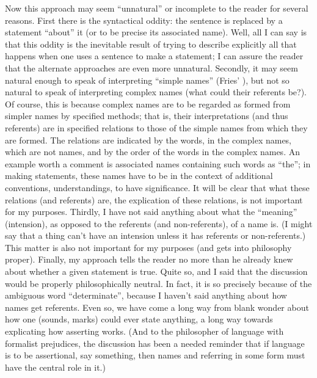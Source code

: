 Now this approach may seem \enquote{unnatural} or incomplete to the reader 
for several reasons. First there is the syntactical oddity: the sentence is 
replaced by a statement \enquote{about} it (or to be precise its associated name). 
Well, all I can say is that this oddity is the inevitable result of trying to 
describe explicitly all that happens when one uses a sentence to make a 
statement; I can assure the reader that the alternate approaches are even 
more unnatural. Secondly, it may seem natural enough to speak of 
interpreting \enquote{simple names} (Fries' ), but not so natural to 
speak of interpreting complex names (what could their referents be?). Of 
course, this is because complex names are to be regarded as formed from 
simpler names by specified methods; that is, their interpretations (and thus 
referents) are in specified relations to those of the simple names from which 
they are formed. The relations are indicated by the words, in the complex 
names, which are not names, and by the order of the words in the complex 
names. An example worth a comment is associated names containing such 
words as \enquote{the}; in making statements, these names have to be in the context 
of additional conventions, understandings, to have significance. It will be 
clear that what these relations (and referents) are, the explication of these 
relations, is not important for my purposes. Thirdly, I have not said anything 
about what the \enquote{meaning} (intension), as opposed to the referents (and 
non-referents), of a name is. (I might say that a thing can't have an intension 
unless it has referents or non-referents.) This matter is also not important for 
my purposes (and gets into philosophy proper). Finally, my approach tells 
the reader no more than he already knew about whether a given statement is 
true. Quite so, and I said that the discussion would be properly 
philosophically neutral. In fact, it is so precisely because of the ambiguous 
word \enquote{determinate}, because I haven't said anything about how names get 
referents. Even so, we have come a long way from blank wonder about how 
one (sounds, marks) could ever state anything, a long way towards 
explicating how asserting works. (And to the philosopher of language with 
formalist prejudices, the discussion has been a needed reminder that if 
language is to be assertional, say something, then names and referring in 
some form must have the central role in it.) 

